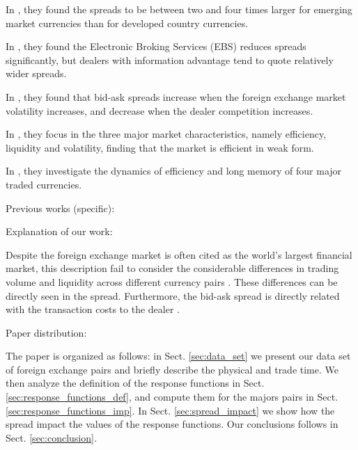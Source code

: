 In \cite{curr_speculation}, they found the spreads to be between two and four
times larger for emerging market currencies than for developed country currencies.

In \cite{electronic_forex}, they found the Electronic Broking Services (EBS)
reduces spreads significantly, but dealers with information advantage tend to
quote relatively wider spreads.

In \cite{spread_competition}, they found that bid-ask spreads increase when the
foreign exchange market volatility increases, and decrease when the dealer
competition increases.

In \cite{intraday_forex}, they focus in the three major market characteristics,
namely efficiency, liquidity and volatility, finding that the market is
efficient in weak form.

In \cite{forex_inefficiency}, they investigate the dynamics of efficiency and
long memory of four major traded currencies.




Previous works (specific):






Explanation of our work:

Despite the foreign exchange market is often cited as the world's largest financial
market, this description fail to consider the considerable differences in trading
volume and liquidity across different currency pairs \cite{forex_microstructure}. These differences can be
directly seen in the spread. Furthermore, the bid-ask spread is directly related
with the transaction costs to the dealer \cite{teach_spread}.




Paper distribution:

The paper is organized as follows: in Sect. \ref{sec:data_set} we present our
data set of foreign exchange pairs and briefly describe the physical and trade time. We then
analyze the definition of the response functions in Sect.
\ref{sec:response_functions_def}, and compute them for the majors pairs in
Sect. \ref{sec:response_functions_imp}.
In Sect. \ref{sec:spread_impact} we show how the spread impact the values of the
response functions. Our conclusions follows in Sect. \ref{sec:conclusion}.